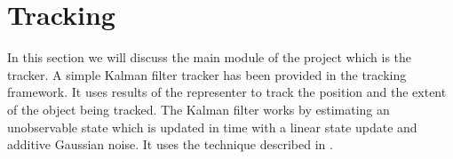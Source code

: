\section{Tracking}

In this section we will discuss the main module of the project which is the tracker. A simple Kalman filter tracker has been provided in the tracking framework. It uses results of the representer to track the position and the extent of the object being tracked. The Kalman filter works by estimating an unobservable state which is updated in time with a linear state update and additive Gaussian noise. It uses the technique described in \cite{Arulampalam01atutorial}.

